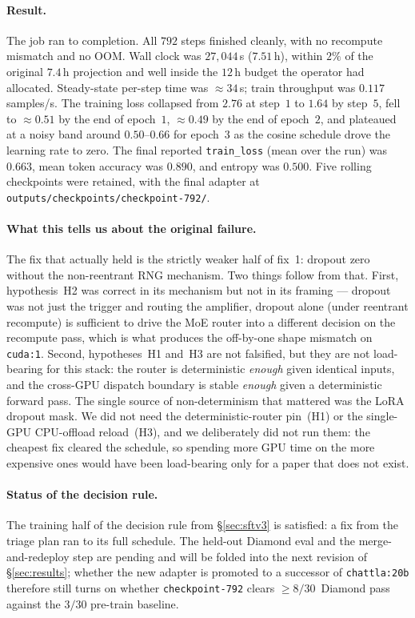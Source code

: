 \documentclass[11pt]{article}
\begin{document}
\paragraph{Result.} The job ran to completion. All $792$ steps
finished cleanly, with no recompute mismatch and no OOM. Wall clock
was $27{,}044$\,s ($7.51$\,h), within $2\%$ of the original $7.4$\,h
projection and well inside the $12$\,h budget the operator had
allocated. Steady-state per-step time was $\approx\!34$\,s; train
throughput was $0.117$\,samples/s. The training loss collapsed from
$2.76$ at step~$1$ to $1.64$ by step~$5$, fell to $\approx\!0.51$ by
the end of epoch~$1$, $\approx\!0.49$ by the end of epoch~$2$, and
plateaued at a noisy band around $0.50$--$0.66$ for epoch~$3$ as the
cosine schedule drove the learning rate to zero. The final reported
\texttt{train\_loss} (mean over the run) was $0.663$, mean token
accuracy was $0.890$, and entropy was $0.500$. Five rolling
checkpoints were retained, with the final adapter at
\texttt{outputs/checkpoints/checkpoint-792/}.

\paragraph{What this tells us about the original failure.} The fix
that actually held is the strictly weaker half of fix~1: dropout zero
without the non-reentrant RNG mechanism. Two things follow from
that. First, hypothesis~H2 was correct in its mechanism but not in
its framing --- dropout was not just the trigger and routing the
amplifier, dropout alone (under reentrant recompute) is sufficient
to drive the MoE router into a different decision on the recompute
pass, which is what produces the off-by-one shape mismatch on
\texttt{cuda:1}. Second, hypotheses~H1 and~H3 are not falsified, but
they are not load-bearing for this stack: the router is determinis\-tic
\emph{enough} given identical inputs, and the cross-GPU dispatch
boundary is stable \emph{enough} given a deterministic forward pass.
The single source of non-determinism that mattered was the LoRA
dropout mask. We did not need the deterministic-router pin~(H1) or
the single-GPU CPU-offload reload~(H3), and we deliberately did not
run them: the cheapest fix cleared the schedule, so spending more
GPU time on the more expensive ones would have been load-bearing
only for a paper that does not exist.

\paragraph{Status of the decision rule.} The training half of the
decision rule from \S\ref{sec:sftv3} is satisfied: a fix from the
triage plan ran to its full schedule. The held-out Diamond eval and
the merge-and-redeploy step are pending and will be folded into the
next revision of \S\ref{sec:results}; whether the new adapter is
promoted to a successor of \texttt{chattla:20b} therefore still
turns on whether \texttt{checkpoint-792} clears
$\ge\!8/30$~Diamond pass against the $3/30$ pre-train baseline.
\end{document}
